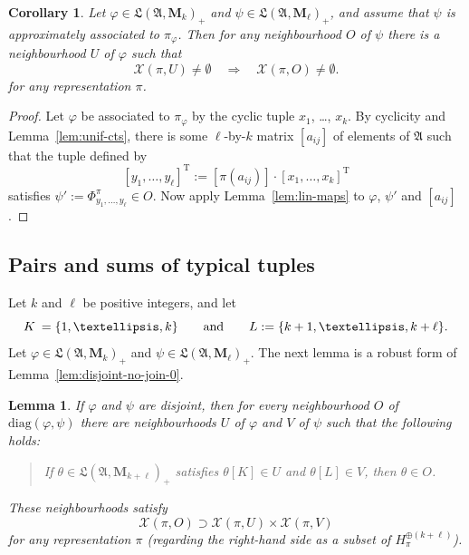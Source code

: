 \documentclass[12pt,a4paper]{article}
\numberwithin{equation}{section}
\newtheorem{lem}[thm]{Lemma}
\newtheorem{cor}[thm]{Corollary}
\theoremstyle{remark}
\renewcommand{\rm}[1]{\mathrm{#1}}
\newcommand{\rmM}{\mathbf{M}}
\newcommand{\X}{\mathcal{X}}
\newcommand{\A}{\mathfrak{A}}
\newcommand{\frL}{\mathfrak{L}}
\renewcommand{\phi}{\varphi}
\begin{document}
\begin{cor}\label{cor:typ-trans}
	Let $\phi \in \frL(\A,\rmM_k)_+$ and $\psi \in \frL(\A,\rmM_\ell)_+$, and assume that $\psi$ is approximately associated to $\pi_\phi$.  Then for any neighbourhood $O$ of $\psi$ there is a neighbourhood $U$ of $\phi$ such that
	\[\X(\pi,U)\ne \emptyset \quad \Rightarrow \quad \X(\pi,O) \ne \emptyset.\]
	for any representation $\pi$.
\end{cor}

\begin{proof}
	Let $\phi$ be associated to $\pi_\phi$ by the cyclic tuple $x_1$, \dots, $x_k$.  By cyclicity and Lemma~\ref{lem:unif-cts}, there is some $\ell$-by-$k$ matrix $[a_{ij}]$ of elements of $\A$ such that the tuple defined by
	\[[y_1, \dots, y_\ell]^\rm{T} := [\pi(a_{ij})]\cdot [x_1,\dots,x_k]^\rm{T}\]
	satisfies $\psi' := \Phi^\pi_{y_1,\dots,y_\ell} \in O$.  Now apply Lemma~\ref{lem:lin-maps} to $\phi$, $\psi'$ and $[a_{ij}]$.
\end{proof}




\subsection{Pairs and sums of typical tuples}

Let $k$ and $\ell$ be positive integers, and let
\[K \:= \{1,\dots,k\} \qquad \hbox{and} \qquad L := \{k+1,\dots,k+\ell\}.\]
Let $\phi \in \frL(\A,\rmM_k)_+$ and $\psi \in \frL(\A,\rmM_\ell)_+$. The next lemma is a robust form of Lemma~\ref{lem:disjoint-no-join-0}.

\begin{lem}\label{lem:disjoint-no-join}
If $\phi$ and $\psi$ are disjoint, then for every neighbourhood $O$ of $\rm{diag}(\phi,\psi)$ there are neighbourhoods $U$ of $\phi
$ and $V$ of $\psi$ such that the following holds:
\begin{quote}
If $\theta \in \frL(\A,\rmM_{k+\ell})_+$ satisfies $\theta[K] \in U$ and $\theta[L] \in V$, then $\theta \in O$.
\end{quote}
These neighbourhoods satisfy
\[\X(\pi,O)\supset \X(\pi,U) \times \X(\pi,V)\]
for any representation $\pi$ (regarding the right-hand side as a subset of $H_\pi^{\oplus(k+\ell)}$).
\end{lem}
\end{document}
